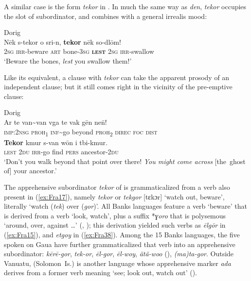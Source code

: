 \documentclass[output=paper,colorlinks,citecolor=brown]{langscibook}
\begin{document}
A similar case is the form \textit{tekor} in . In much the same way as  \textit{den},  \textit{tekor} occupies the slot of subordinator, and combines with a general irrealis mood:

\ea \label{ex:Fra17} \textnormal{Dorig}  \\
\gll Nēk s-tekor o sri-n, \textbf{tekor} nēk so-dlōm! \\
\textsc{2sg} \textsc{irr}-beware \textsc{art} bone-\textsc{3sg} \textsc{\textbf{lest}} \textsc{2sg} \textsc{irr}-swallow \\
\glt `Beware the bones, \textit{lest} you swallow them!' 
\z

\noindent Like its  equivalent, a clause with \textit{tekor} can take the apparent prosody of an independent clause; but it still comes right in the vicinity of the pre-emptive clause:
 
\ea \label{ex:Fra18} \textnormal{Dorig}   \\
\gll Ar te van\textasciitilde van vga te vak gēn ne\={n}! \\ 
\textsc{imp:2nsg} \textsc{proh\textsubscript{1}} \textsc{inf}\textasciitilde go beyond \textsc{proh\textsubscript{2}} \textsc{direc} \textsc{foc} \textsc{dist} \\
\linebreak \gll \textbf{Tekor} kmur s-van wōn i tbi-kmur. \\
\textsc{lest} \textsc{2du} \textsc{irr}-go find \textsc{pers} ancestor-\textsc{2du} \\
\glt `Don't you walk beyond that point over there! \textit{You might come across} [the~ghost of] your ancestor.' 
\z

The apprehensive subordinator \textit{tekor} of  is grammaticalized from a verb also present in (\ref{ex:Fra17}), namely \textit{tekor} or \textit{tekgor} [tɛkɔr] `watch out, beware', literally `watch (\textit{tek}) over (\textit{gor})'. All Banks languages feature a verb `beware' that is derived from a verb `look, watch', plus a suffix *\textit{ɣoro} that is polysemous `around, over, against {\ldots}' (\citealt{François2000}, \citeyear[495]{François2005b}); this derivation yielded such verbs as  \textit{ēlgōr} in (\ref{ex:Fra15}), and  \textit{etgoy} in (\ref{ex:Fra38}). Among the 15 Banks languages, the five spoken on Gaua have further grammaticalized that verb into an apprehensive subordinator:  \textit{kērē-gor},  \textit{tek-or},  \textit{ēl-gor},  \mbox{\textit{ēl-woy}},  \textit{ätä-woo} (),  \textit{(ma)ta-gor}. Outside Vanuatu,  (Solomon~Is.) is another  language whose apprehensive marker \textit{ada} derives from a former verb meaning `see; look out, watch out' (\citealt[780]{Lichtenberk2008}).
\end{document}
